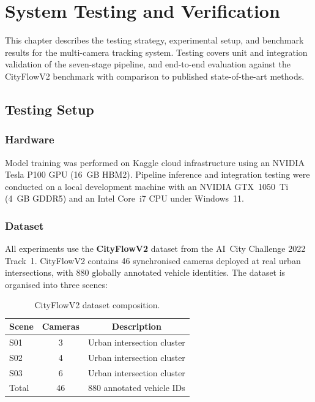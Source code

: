 \chapter{System Testing and Verification}

This chapter describes the testing strategy, experimental setup, and benchmark results for the multi-camera tracking system. Testing covers unit and integration validation of the seven-stage pipeline, and end-to-end evaluation against the CityFlowV2 benchmark with comparison to published state-of-the-art methods.

\section{Testing Setup}

\subsection{Hardware}

Model training was performed on Kaggle cloud infrastructure using an NVIDIA Tesla P100 GPU (16~GB HBM2). Pipeline inference and integration testing were conducted on a local development machine with an NVIDIA GTX~1050~Ti (4~GB GDDR5) and an Intel Core~i7 CPU under Windows~11.

\subsection{Dataset}

All experiments use the \textbf{CityFlowV2} dataset from the AI~City Challenge 2022 Track~1. CityFlowV2 contains 46 synchronised cameras deployed at real urban intersections, with 880 globally annotated vehicle identities. The dataset is organised into three scenes:

\begin{table}[htbp]
\centering
\caption{CityFlowV2 dataset composition.}
\label{tab:dataset}
\begin{tabular}{lcc}
\hline
\textbf{Scene} & \textbf{Cameras} & \textbf{Description} \\ \hline
S01 & 3  & Urban intersection cluster \\
S02 & 4  & Urban intersection cluster \\
S03 & 6  & Urban intersection cluster \\
Total & 46 & 880 annotated vehicle IDs \\ \hline
\end{tabular}
\end{table}

